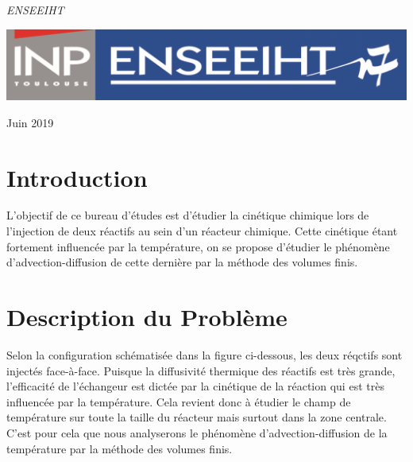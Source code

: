 \documentclass[a4paper,oneside]{article}
\begin{document}
\begin{titlepage}
	\vspace{0.5\baselineskip} %

	\textit{ENSEEIHT} %

	\vfill %


	\includegraphics[scale=0.3]{logoN7.png} %

	\vspace{0.3\baselineskip} %

Juin 2019 %
\end{titlepage}
\newpage

\tableofcontents
\newpage

\section{Introduction}

L'objectif de ce bureau d'études est d'étudier la cinétique chimique lors de l'injection de deux réactifs au sein 
d'un réacteur chimique. Cette cinétique étant fortement influencée par la température, on se propose d'étudier le phénomène 
d'advection-diffusion de cette dernière par la méthode des volumes finis.

\section{Description du Problème}

Selon la configuration schématisée dans la figure ci-dessous, les deux réqctifs sont injectés face-à-face.
Puisque la diffusivité thermique des réactifs est très grande, l'efficacité de l'échangeur est dictée par la cinétique de la réaction qui est très influencée par la température. Cela revient donc à étudier le champ de température sur toute la taille du réacteur mais surtout dans la zone centrale. C'est pour cela que nous analyserons le phénomène d'advection-diffusion de la température par la méthode des volumes finis. 
\end{document}
